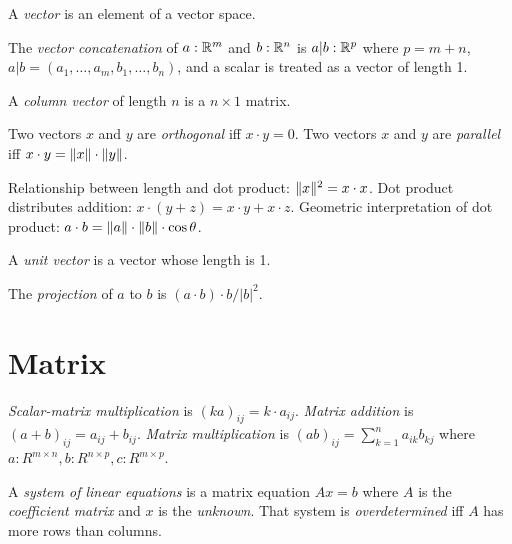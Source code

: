 %
A \emph{vector} is an element of a vector space.

%
%
%
The \emph{vector concatenation} of \(a : \mathbb{R}^m\) and \(b : \mathbb{R}^n\)
is \(a|b : \mathbb{R}^p\)
where \(p = m + n\),
\(a|b = (a_1 , \ldots , a_m , b_1 , \ldots , b_n)\),
and a scalar is treated as a vector of length 1.

%
%
A \emph{column vector} of length \(n\) is a \(n \times 1\) matrix.

%
%
Two vectors \(x\) and \(y\) are \emph{orthogonal} iff \(x \cdot y = 0\).
%
%
Two vectors \(x\) and \(y\) are \emph{parallel} iff \(x \cdot y = \lVert x\rVert \cdot \lVert y\rVert\).

%
%
Relationship between length and dot product: \(\lVert x\rVert^2 = x \cdot x\).
Dot product distributes addition: \(x \cdot (y+z) = x \cdot y + x \cdot z\).
Geometric interpretation of dot product: \(a \cdot b = \lVert a\rVert \cdot \lVert b\rVert \cdot \cos \theta\).

%
%
A \emph{unit vector} is a vector whose length is 1.

%
%
%
The \emph{projection} of \(a\) to \(b\) is \((a \cdot b) \cdot b / |b|^2\).

\section{Matrix}

%
\emph{Scalar-matrix multiplication} is \((ka)_{ij} = k \cdot a_{ij}\).
%
%
\emph{Matrix addition} is \((a + b)_{ij} = a_{ij} + b_{ij}\).
%
%
\emph{Matrix multiplication} is \((ab)_{ij} = \sum_{k=1}^n a_{ik} b_{kj}\) where
\(a : R^{m \times n}, b : R^{n \times p}, c : R^{m \times p}\).

%
%
%
%
A \emph{system of linear equations} is a matrix equation \(A x = b\)
where \(A\) is the \emph{coefficient matrix} and \(x\) is the \emph{unknown}.
%
%
That system is \emph{overdetermined} iff \(A\) has more rows than columns.

